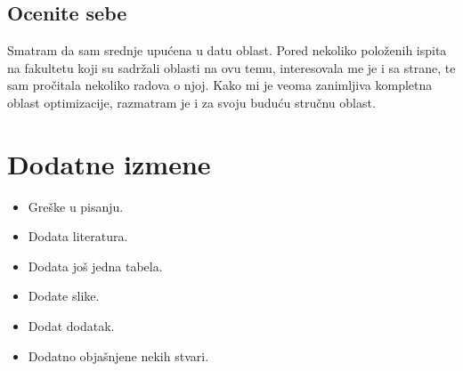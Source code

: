 \documentclass[a4paper]{report}
\begin{document}
\section{Ocenite sebe}

Smatram da sam srednje upućena u datu oblast. Pored nekoliko položenih  ispita na fakultetu koji su sadržali oblasti na ovu temu, interesovala me je i sa strane, te sam pročitala nekoliko radova o njoj. Kako mi je veoma zanimljiva kompletna oblast optimizacije, razmatram je i za svoju buduću stručnu oblast. 





\chapter{Dodatne izmene}
\begin{itemize}
\item Greške u pisanju.
\item Dodata literatura.
\item Dodata još jedna tabela.
\item Dodate slike.
\item Dodat dodatak.
\item Dodatno objašnjene nekih stvari.
\end{itemize}
\end{document}
